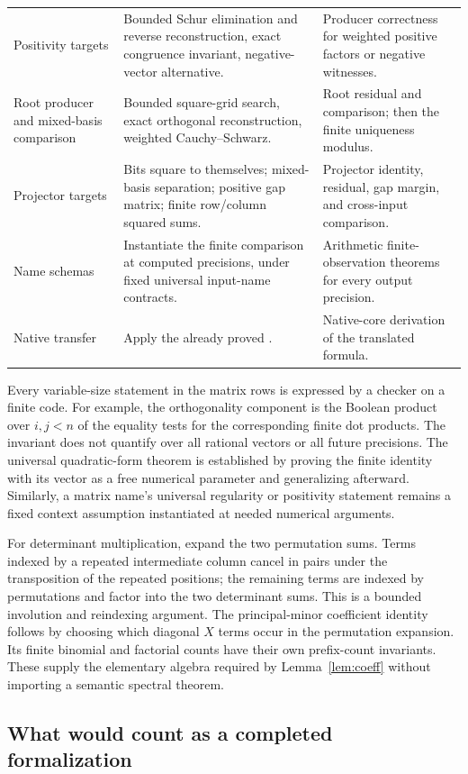 \begin{longtable}{@{}P{0.25\textwidth}P{0.43\textwidth}P{0.26\textwidth}@{}}
Positivity targets & Bounded Schur elimination and reverse reconstruction, exact congruence invariant, negative-vector alternative. & Producer correctness for weighted positive factors or negative witnesses. \\
Root producer and mixed-basis comparison & Bounded square-grid search, exact orthogonal reconstruction, weighted Cauchy--Schwarz. & Root residual and comparison; then the finite uniqueness modulus. \\
Projector targets & Bits square to themselves; mixed-basis separation; positive gap matrix; finite row/column squared sums. & Projector identity, residual, gap margin, and cross-input comparison. \\
Name schemas & Instantiate the finite comparison at computed precisions, under fixed universal input-name contracts. & Arithmetic finite-observation theorems for every output precision. \\
Native transfer & Apply the already proved . & Native-core derivation of the translated formula. \\
\bottomrule
\end{longtable}

Every variable-size statement in the matrix rows is expressed by a checker on a finite code. For example, the orthogonality component is the Boolean product over $i,j<n$ of the equality tests for the corresponding finite dot products. The invariant does not quantify over all rational vectors or all future precisions. The universal quadratic-form theorem is established by proving the finite identity with its vector as a free numerical parameter and generalizing afterward. Similarly, a matrix name's universal regularity or positivity statement remains a fixed context assumption instantiated at needed numerical arguments.

For determinant multiplication, expand the two permutation sums. Terms indexed by a repeated intermediate column cancel in pairs under the transposition of the repeated positions; the remaining terms are indexed by permutations and factor into the two determinant sums. This is a bounded involution and reindexing argument. The principal-minor coefficient identity follows by choosing which diagonal $X$ terms occur in the permutation expansion. Its finite binomial and factorial counts have their own prefix-count invariants. These supply the elementary algebra required by Lemma~\ref{lem:coeff} without importing a semantic spectral theorem.

\subsection{What would count as a completed formalization}

